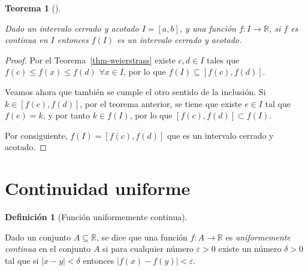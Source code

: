 \documentclass[
  a4paper,
]{scrreport}
\theoremstyle{plain}
\newtheorem{theorem}{Teorema}[chapter]
\theoremstyle{definition}
\theoremstyle{plain}
\theoremstyle{plain}
\theoremstyle{definition}
\theoremstyle{definition}
\newtheorem{definition}{Definición}[chapter]
\theoremstyle{remark}
\begin{document}
\begin{theorem}[]\protect\hypertarget{thm-imagen-funcion-continua-intervalo-cerrado-acotado}{}\label{thm-imagen-funcion-continua-intervalo-cerrado-acotado}

Dado un intervalo cerrado y acotado \(I=[a,b]\), y una función
\(f:I\to\mathbb{R}\), si \(f\) es continua en \(I\) entonces \(f(I)\) es
un intervalo cerrado y acotado.

\end{theorem}

\begin{tcolorbox}[enhanced jigsaw, titlerule=0mm, arc=.35mm, colframe=quarto-callout-note-color-frame, bottomrule=.15mm, opacitybacktitle=0.6, rightrule=.15mm, coltitle=black, colback=white, toprule=.15mm, title=\textcolor{quarto-callout-note-color}{\faInfo}\hspace{0.5em}{Demostración}, leftrule=.75mm, bottomtitle=1mm, opacityback=0, breakable, colbacktitle=quarto-callout-note-color!10!white, toptitle=1mm, left=2mm]

\begin{proof}
Por el Teorema~\ref{thm-weierstrass} existe \(c,d\in I\) tales que
\(f(c)\leq f(x)\leq f(d)\) \(\forall x\in I\), por lo que
\(f(I)\subseteq[f(c), f(d)]\).

Veamos ahora que también se cumple el otro sentido de la inclusión. Si
\(k\in[f(c),f(d)]\), por el teorema anterior, se tiene que existe
\(e\in I\) tal que \(f(e)=k\), y por tanto \(k\in f(I)\), por lo que
\([f(c),f(d)]\subset f(I)\).

Por consiguiente, \(f(I)=[f(c),f(d)]\) que es un intervalo cerrado y
acotado.
\end{proof}

\end{tcolorbox}

\section{Continuidad uniforme}\label{continuidad-uniforme}

\begin{definition}[Función uniformemente
continua]\protect\hypertarget{def-funcion-continua-uniformemente}{}\label{def-funcion-continua-uniformemente}

Dado un conjunto \(A\subseteq \mathbb{R}\), se dice que una función
\(f:A\to \mathbb{R}\) es \emph{uniformemente continua} en el conjunto
\(A\) si para cualquier número \(\varepsilon>0\) existe un número
\(\delta>0\) tal que si \(|x-y|<\delta\) entonces
\(|f(x)-f(y)|<\varepsilon.\)

\end{definition}
\end{document}
